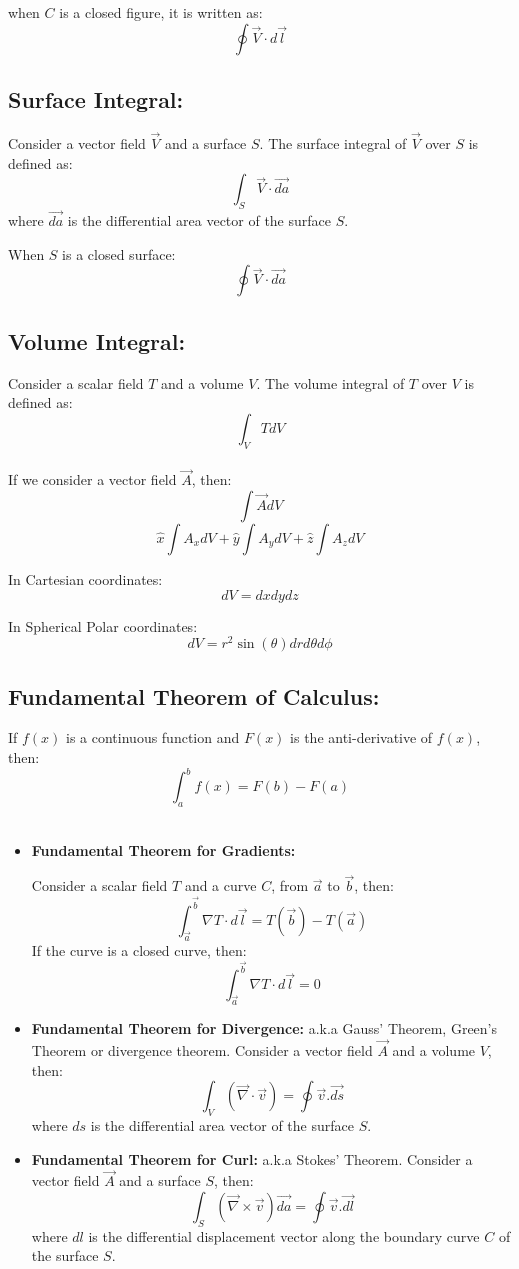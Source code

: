 \documentclass{article}
\begin{document}
when $C$ is a closed figure, it is written as:
\[\oint \vec{V} \cdot d\vec{l}\]
\subsection{Surface Integral: }
Consider a vector field $\vec{V}$ and a surface $S$. The surface integral of $\vec{V}$ over $S$ is defined as:
\[\int_{S} \vec{V}\cdot \vec{da}\]
where $\vec{da}$ is the differential area vector of the surface $S$.

When $S$ is a closed surface:
\[\oint \vec{V}\cdot\vec{da}\]

\subsection{Volume Integral: }
Consider a scalar field $T$ and a volume $V$. The volume integral of $T$ over $V$ is defined as:
\[\int_{V} T dV\]
\\
If we consider a vector field $\vec{A}$, then:
\[\int \vec{A} dV\]
\[\hat{x} \int A_x dV + \hat{y} \int A_y dV + \hat{z} \int A_z dV\]

In Cartesian coordinates:
\[dV = dx dy dz\]

In Spherical Polar coordinates:
\[dV = r^2 \sin(\theta) dr d\theta d\phi\]

\subsection{Fundamental Theorem of Calculus: }
If $f(x)$ is a continuous function and $F(x)$ is the anti-derivative of $f(x)$, then:
\[\int_{a}^{b} f(x) = F(b) - F(a)\]
\\

\begin{itemize}
    \item \textbf{Fundamental Theorem for Gradients: }

Consider a scalar field $T$ and a curve $C$, from $\vec{a}$ to $\vec{b}$, then:
\[\int_{\vec{a}}^{\vec{b}} \nabla T \cdot d\vec{l} = T(\vec{b}) - T(\vec{a})\]
If the curve is a closed curve, then:
\[\int_{\vec{a}}^{\vec{b}} \nabla T \cdot d\vec{l} = 0\]

\item \textbf{Fundamental Theorem for Divergence: } a.k.a Gauss' Theorem, Green's Theorem or divergence theorem.
Consider a vector field $\vec{A}$ and a volume $V$, then:
\[\int_{V}\left(\vec{\nabla} \cdot \vec{v}\right) = \oint \vec{v}.\vec{ds}\]
where $ds$  is the differential area vector of the surface $S$.

\item \textbf{Fundamental Theorem for Curl: } a.k.a Stokes' Theorem.
Consider a vector field $\vec{A}$ and a surface $S$, then:
\[\int_{S}\left(\vec{\nabla} \times \vec{v}\right) \vec{da}= \oint \vec{v}.\vec{dl}\]
where $dl$  is the differential displacement vector along the boundary curve $C$ of the surface $S$.

\end{itemize}
\end{document}
